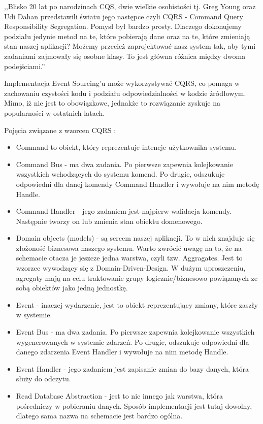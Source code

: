 ,,Blisko 20 lat po narodzinach CQS, dwie wielkie osobistości tj. Greg Young oraz Udi Dahan przedstawili światu jego następce czyli CQRS - Command Query Responsibility Segregation. Pomysł był bardzo prosty. Dlaczego dokonujemy podziału jedynie metod na te, które pobierają dane oraz na te, które zmieniają stan naszej aplikacji? Możemy przecież zaprojektować nasz system tak, aby tymi zadaniami zajmowały się osobne klasy. To jest główna różnica między dwoma podejściami.''\cite{cqrs1}


Implementacja Event Sourcing'u może wykorzystywać CQRS, co pomaga w zachowaniu czystości kodu i podziału odpowiedzialności w kodzie źródłowym. Mimo, iż nie jest to obowiązkowe, jednakże to rozwiązanie zyskuje na popularności w ostatnich latach.

Pojęcia związane z wzorcen CQRS \cite{cqrs1}:
\begin{itemize}
    \item Command to obiekt, który reprezentuje intencje użytkownika systemu. 
    \item Command Bus - ma dwa zadania. Po pierwsze zapewnia kolejkowanie wszystkich wchodzących do systemu komend. Po drugie, odszukuje odpowiedni dla danej komendy Command Handler i wywołuje na nim metodę Handle.
    \item Command Handler - jego zadaniem jest najpierw walidacja komendy. Następnie tworzy on lub zmienia stan obiektu domenowego.
    \item Domain objects (models) - są sercem naszej aplikacji. To w nich znajduje się złożoność biznesowa naszego systemu. Warto zwrócić uwagę na to, że na schemacie otacza je jeszcze jedna warstwa, czyli tzw. Aggragates. Jest to wzorzec wywodzący się z Domain-Driven-Design. W dużym uproszczeniu, agregaty mają na celu traktowanie grupy logicznie/biznesowo powiązanych ze sobą obiektów jako jedną jednostkę.
    \item Event - inaczej wydarzenie, jest to obiekt reprezentujący zmiany, które zaszły w systemie. 
    \item Event Bus - ma dwa zadania. Po pierwsze zapewnia kolejkowanie wszystkich wygenerowanych w systemie zdarzeń. Po drugie, odszukuje odpowiedni dla danego zdarzenia Event Handler i wywołuje na nim metodę Handle.
    \item Event Handler - jego zadaniem jest zapisanie zmian do bazy danych, która służy do odczytu.
    \item Read Database Abstraction - jest to nic innego jak warstwa, która pośredniczy w pobieraniu danych. Sposób implementacji jest tutaj dowolny, dlatego sama nazwa na schemacie jest bardzo ogólna.
\end{itemize}


